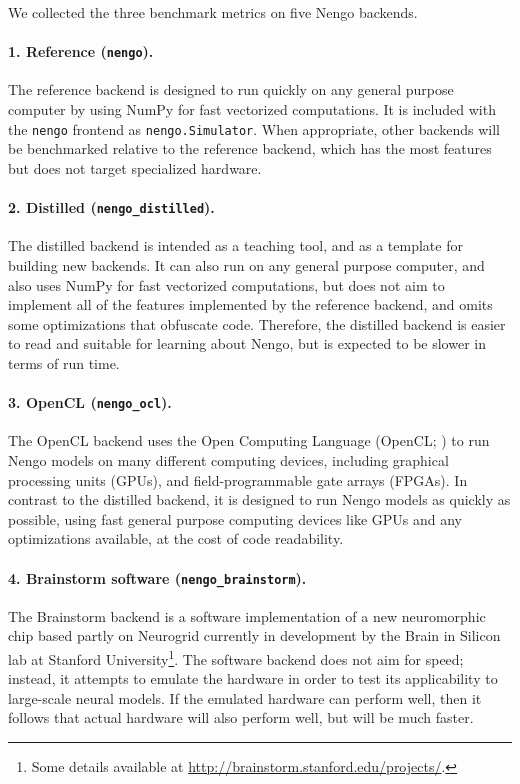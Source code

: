 \documentclass{frontiersSCNS}
\begin{document}
We collected the three benchmark metrics
on five Nengo backends.

\paragraph{1. Reference (\texttt{nengo}).}
The reference backend is designed to run quickly
on any general purpose computer
by using NumPy \cite{vanderwalt2011}
for fast vectorized computations.
It is included with the \texttt{nengo} frontend
as \texttt{nengo.Simulator}.
When appropriate, other backends will be benchmarked
relative to the reference backend,
which has the most features but does not target
specialized hardware.

\paragraph{2. Distilled (\texttt{nengo\_distilled}).}
The distilled backend is intended as a teaching tool,
and as a template for building new backends.
It can also run on any general purpose computer,
and also uses NumPy for fast vectorized computations,
but does not aim to implement all of the features
implemented by the reference backend,
and omits some optimizations that obfuscate code.
Therefore, the distilled backend is easier to read
and suitable for learning about Nengo,
but is expected to be slower in terms of run time.

\paragraph{3. OpenCL (\texttt{nengo\_ocl}).}
The OpenCL backend uses the Open Computing Language
(OpenCL; \cite{stone2010})
to run Nengo models on many different computing devices,
including graphical processing units (GPUs),
and field-programmable gate arrays (FPGAs).
In contrast to the distilled backend,
it is designed to run Nengo models
as quickly as possible,
using fast general purpose computing devices
like GPUs and any optimizations available,
at the cost of code readability.

\paragraph{4. Brainstorm software (\texttt{nengo\_brainstorm}).}
The Brainstorm backend is a software implementation
of a new neuromorphic chip
based partly on Neurogrid \cite{benjamin2014}
currently in development
by the Brain in Silicon lab
at Stanford University\footnote{
  Some details available at \url{http://brainstorm.stanford.edu/projects/}.}.
The software backend does not aim for speed;
instead, it attempts to emulate the hardware
in order to test its applicability
to large-scale neural models.
If the emulated hardware can perform well,
then it follows that actual hardware
will also perform well,
but will be much faster.
\end{document}
